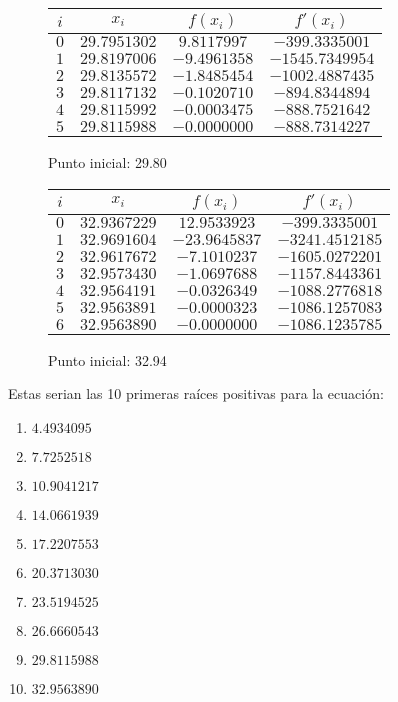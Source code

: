 \begin{figure}[H]
	\centering
	\caption{Punto inicial: 29.80}
	\begin{tabular}{|c|c|c|c|} \hline
		$i$ & $x_{i}$ & $f(x_{i})$ & $f'(x_{i})$ \\ \hline
		$0$ & $29.7951302$ & $9.8117997$ & $-399.3335001$ \\ \hline
		$1$ & $29.8197006$ & $-9.4961358$ & $-1545.7349954$ \\ \hline
		$2$ & $29.8135572$ & $-1.8485454$ & $-1002.4887435$ \\ \hline
		$3$ & $29.8117132$ & $-0.1020710$ & $-894.8344894$ \\ \hline
		$4$ & $29.8115992$ & $-0.0003475$ & $-888.7521642$ \\ \hline
		$5$ & $29.8115988$ & $-0.0000000$ & $-888.7314227$ \\ \hline
	\end{tabular}
\end{figure}
\begin{figure}[H]
	\centering
	\caption{Punto inicial: 32.94}
	\begin{tabular}{|c|c|c|c|} \hline
		$i$ & $x_{i}$ & $f(x_{i})$ & $f'(x_{i})$ \\ \hline
		$0$ & $32.9367229$ & $12.9533923$ & $-399.3335001$ \\ \hline
		$1$ & $32.9691604$ & $-23.9645837$ & $-3241.4512185$ \\ \hline
		$2$ & $32.9617672$ & $-7.1010237$ & $-1605.0272201$ \\ \hline
		$3$ & $32.9573430$ & $-1.0697688$ & $-1157.8443361$ \\ \hline
		$4$ & $32.9564191$ & $-0.0326349$ & $-1088.2776818$ \\ \hline
		$5$ & $32.9563891$ & $-0.0000323$ & $-1086.1257083$ \\ \hline
		$6$ & $32.9563890$ & $-0.0000000$ & $-1086.1235785$ \\ \hline
	\end{tabular}
\end{figure}
\vspace{1cm}

Estas serian las 10 primeras raíces positivas para la ecuación:
\begin{enumerate}
	\item $4.4934095$
	\item $7.7252518$
	\item $10.9041217$
	\item $14.0661939$
	\item $17.2207553$
	\item $20.3713030$
	\item $23.5194525$
	\item $26.6660543$
	\item $29.8115988$
	\item $32.9563890$
\end{enumerate}

